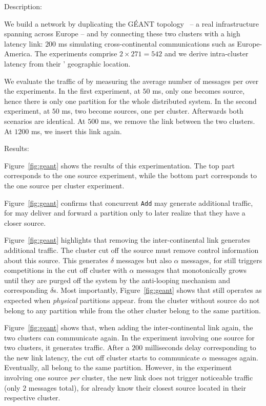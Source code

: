 \begin{asparadesc}
\item [Description:]

We build a network by duplicating the G{\'E}ANT
topology~\cite{knight2011internet} -- a real infrastructure spanning
across Europe -- and by connecting these two clusters with a high
latency link: $200$ ms simulating cross-continental communications
such as Europe-America. The experiments comprise $2 \times 271 = 542$
\processes and we derive intra-cluster latency from their \processes'
geographic location.

\noindent We evaluate the traffic of \NAME by measuring the average
number of messages per \process over the experiments. In the first
experiment, at $50$ ms, only one \process becomes source, hence there
is only one partition for the whole distributed system. In the second
experiment, at $50$ ms, two \processes become sources, one per
cluster. Afterwards both scenarios are identical. At $500$ ms, we
remove the link between the two clusters. At $1200$ ms, we insert this
link again.

\item [Results:]

Figure~\ref{fig:geant} shows the results of this experimentation. The
top part corresponds to the one source experiment, while the bottom
part corresponds to the one source per cluster experiment.

\noindent Figure~\ref{fig:geant} confirms that concurrent \texttt{Add}
may generate additional traffic, for \processes may deliver and forward
a partition only to later realize that they have a closer source. 

\noindent Figure~\ref{fig:geant} highlights that removing the
inter-continental link generates additional traffic. The cluster cut
off the source must remove control information about this source. This
generates $\delta$ messages but also $\alpha$ messages, for \NAME
still triggers competitions in the cut off cluster with $\alpha$
messages that monotonically grows until they are purged off the system
by the anti-looping mechanism and corresponding $\delta$s.  Most
importantly, Figure~\ref{fig:geant} shows that \NAME still operates
as expected when \emph{physical} partitions appear. \Processes from the
cluster without source do not belong to any partition while \processes
from the other cluster belong to the same partition.

\noindent Figure~\ref{fig:geant} shows that, when adding the
inter-continental link again, the two clusters can communicate
again. In the experiment involving one source for two clusters, it
generates traffic. After a $200$ milliseconds delay corresponding to
the new link latency, the cut off cluster starts to communicate
$\alpha$ messages again. Eventually, all \processes belong to the same
partition. However, in the experiment involving one source \emph{per}
cluster, the new link does not trigger noticeable traffic (only $2$
messages total), for \processes already know their closest source
located in their respective cluster.


\end{asparadesc}
